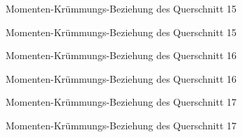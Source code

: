 \documentclass[
  11pt,
  letterpaper,
]{scrreprt}
\begin{document}
\begin{figure}[H]


\caption{\label{fig-qs_15}Momenten-Krümmungs-Beziehung des Querschnitt
15}

\end{figure}%

\begin{figure}[H]


\caption{\label{fig-m_chi_15}Momenten-Krümmungs-Beziehung des
Querschnitt 15}

\end{figure}%

\begin{figure}[H]


\caption{\label{fig-qs_16}Momenten-Krümmungs-Beziehung des Querschnitt
16}

\end{figure}%

\begin{figure}[H]


\caption{\label{fig-m_chi_16}Momenten-Krümmungs-Beziehung des
Querschnitt 16}

\end{figure}%

\begin{figure}[H]


\caption{\label{fig-qs_17}Momenten-Krümmungs-Beziehung des Querschnitt
17}

\end{figure}%

\begin{figure}[H]


\caption{\label{fig-m_chi_17}Momenten-Krümmungs-Beziehung des
Querschnitt 17}

\end{figure}%
\end{document}

